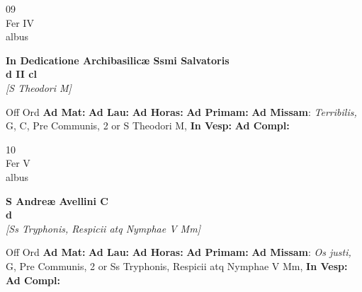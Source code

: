 \documentclass[10pt, openany]{book}
\begin{document}
    \begin{center}
        \begin{minipage}{3.5in}
            \vspace{2em}
            \begin{minipage}{0.5in}
                {\Huge 09} \\
                {\normalsize Fer IV} \\
                {\normalsize albus}
            \end{minipage}
            \begin{minipage}{3.0in}
                \textbf{ \large In Dedicatione Archibasilicæ Ssmi Salvatoris \\
                \textnormal{\normalsize d II cl}} \\ \textit{[S Theodori M]} \\ 
            \end{minipage}
            \begin{justify}Off Ord
                \textbf{Ad Mat: }
                \textbf{Ad Lau: }
                \textbf{Ad Horas: }
                \textbf{Ad Primam: }\textbf{Ad Missam}: \textit{Terribilis,} G, C, Pre Communis, 2 or S Theodori M,  
                \textbf{In Vesp: }
                \textbf{Ad Compl: }
            \end{justify}
        \end{minipage}
    \end{center}

    \begin{center}
        \begin{minipage}{3.5in}
            \vspace{2em}
            \begin{minipage}{0.5in}
                {\Huge 10} \\
                {\normalsize Fer V} \\
                {\normalsize albus}
            \end{minipage}
            \begin{minipage}{3.0in}
                \textbf{ \large S Andreæ Avellini C \\
                \textnormal{\normalsize d}} \\ \textit{[Ss Tryphonis, Respicii atq Nymphae V Mm]} \\ 
            \end{minipage}
            \begin{justify}Off Ord
                \textbf{Ad Mat: }
                \textbf{Ad Lau: }
                \textbf{Ad Horas: }
                \textbf{Ad Primam: }\textbf{Ad Missam}: \textit{Os justi,} G, Pre Communis, 2 or Ss Tryphonis, Respicii atq Nymphae V Mm,  
                \textbf{In Vesp: }
                \textbf{Ad Compl: }
            \end{justify}
        \end{minipage}
    \end{center}
\end{document}
